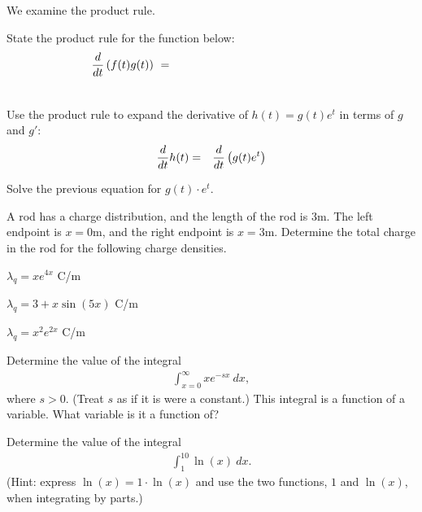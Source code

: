 \begin{problem}
  \item We examine the product rule.
  \begin{subproblem}
    \item   State the product rule for the function below:
  \begin{eqnarray*}
    \lefteqn{\frac{d}{dt} \lp f(t) g(t) \rp  ~ = } \hspace{20em} \\
    & &
  \end{eqnarray*}
  \item Use the product rule to expand the derivative of $h(t)=g(t)e^t$ in terms of
      $g$ and $g'$:
      \begin{eqnarray*}
        \frac{d}{dt} h(t) & = &  \frac{d}{dt} \left( g(t) e^t \right)
      \end{eqnarray*}
      \vfill
  \item   Solve the previous equation for $g(t) \cdot e^t$.
  \vfill
\end{subproblem}
\end{problem}



\begin{problem}
\item A rod has a charge distribution, and the length of the rod is
  3m. The left endpoint is $x=0$m, and the right endpoint is
  $x=3$m. Determine the total charge in the rod for the following
  charge densities.
  \begin{subproblem}
    \item $\lambda_q = xe^{4x}$ C/m
      \vfill
    \item $\lambda_q = 3+x\sin(5x)$ C/m
      \vfill
      \clearpage
    \item $\lambda_q = x^2 e^{2x} $ C/m
      \vfill
  \end{subproblem}
  \item  Determine the value of the integral
  \begin{eqnarray*}
    \int_{x=0}^\infty x e^{-sx} ~ dx,
  \end{eqnarray*}
  where $s>0$. (Treat $s$ as if it is were a constant.)
  This integral is a function of a variable. What variable is it a function of?
  \vfill
  \clearpage
  \item Determine the value of the integral
  \begin{eqnarray*}
    \int^{10}_1 \ln(x) ~ dx.
  \end{eqnarray*}
  (Hint: express $\ln(x)=1\cdot\ln(x)$ and use the two functions, $1$ and $\ln(x)$, when integrating by parts.)
\end{problem}

